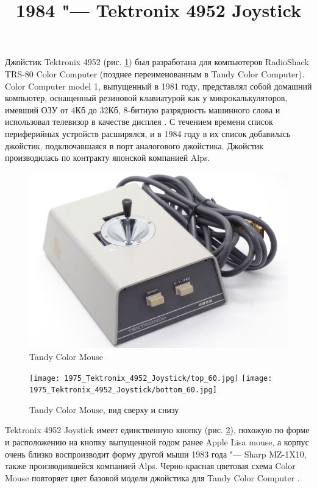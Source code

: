 \documentclass[11pt, a4paper]{article}
\begin{document}
\title{1984 "--- Tektronix 4952 Joystick}
\date{}
\maketitle
{}
Джойстик Tektronix 4952 (рис. \ref{fig:TektronixJoystickPic}) был разработана для компьютеров RadioShack TRS-80 Color Computer (позднее переименованным в Tandy Color Computer). Color Computer model 1, выпущенный в 1981 году, представлял собой домашний компьютер, оснащенный резиновой клавиатурой как у микрокалькуляторов, имевший ОЗУ от 4Кб до 32Кб, 8-битную разрядность машинного слова и использовал телевизор в качестве дисплея \cite{wiki}. С течением времени список периферийных устройств расширялся, и в 1984 году в их список добавилась джойстик\cite{adv}, подключавшаяся в порт аналогового джойстика. Джойстик производилась по контракту японской компанией Alps.

\begin{figure}[h]
    \centering
    \includegraphics[scale=0.6]{1975_Tektronix_4952_Joystick/pic_30.jpg}
    \caption{Tandy Color Mouse}
    \label{fig:TektronixJoystickPic}
\end{figure}

\begin{figure}[h]
    \centering
    \texttt{[image: 1975\_Tektronix\_4952\_Joystick/top\_60.jpg]}
    \texttt{[image: 1975\_Tektronix\_4952\_Joystick/bottom\_60.jpg]}
    \caption{Tandy Color Mouse, вид сверху и снизу}
    \label{fig:TektronixJoystickTopAndBottom}
\end{figure}

Tektronix 4952 Joystick имеет единственную кнопку (рис. \ref{fig:TektronixJoystickTopAndBottom}), похожую по форме и расположению на кнопку выпущенной годом ранее Apple Lisa mouse, а корпус очень близко воспроизводит форму другой мыши 1983 года "--- Sharp MZ-1X10, также производившейся компанией Alps. Черно-красная цветовая схема Color Mouse повторяет цвет базовой модели джойстика для Tandy Color Computer \cite{hierophant}.
\end{document}
